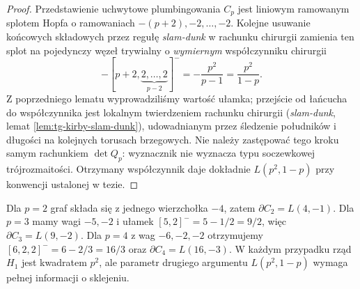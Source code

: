 \begin{proof}
Przedstawienie uchwytowe plumbingowania $C_p$
jest liniowym ramowanym splotem Hopfa o ramowaniach
$-(p+2),-2,\ldots,-2$.
Kolejne usuwanie końcowych składowych przez
regułę \emph{slam-dunk} w rachunku chirurgii
zamienia ten splot na pojedynczy węzeł trywialny
o \emph{wymiernym} współczynniku chirurgii
\[
-[p+2,\underbrace{2,\ldots,2}_{p-2}]^-
=-\frac{p^2}{p-1}=\frac{p^2}{1-p}.
\]
Z poprzedniego lematu wyprowadziliśmy wartość
ułamka; przejście od łańcucha do współczynnika
jest lokalnym twierdzeniem rachunku chirurgii
(\emph{slam-dunk}, lemat \ref{lem:tg-kirby-slam-dunk}),
udowadnianym przez śledzenie
południków i długości na kolejnych torusach brzegowych.
Nie należy zastępować tego kroku samym rachunkiem
$\det Q_p$: wyznacznik nie wyznacza typu soczewkowej
trójrozmaitości. Otrzymany współczynnik daje dokładnie
$L(p^2,1-p)$ przy konwencji ustalonej w tezie.
\end{proof}

\begin{przyklad}[Przypadki $p=2,3,4$]
Dla $p=2$ graf składa się z jednego wierzchołka
$-4$, zatem $\partial C_2=L(4,-1)$.
Dla $p=3$ mamy wagi $-5,-2$ i ułamek
$[5,2]^-=5-1/2=9/2$, więc
$\partial C_3=L(9,-2)$.
Dla $p=4$ z wag $-6,-2,-2$ otrzymujemy
$[6,2,2]^-=6-2/3=16/3$ oraz
$\partial C_4=L(16,-3)$.
W każdym przypadku rząd $H_1$ jest kwadratem $p^2$,
ale parametr drugiego argumentu $L(p^2,1-p)$
wymaga pełnej informacji o sklejeniu.
\end{przyklad}

\begin{center}
\end{center}

